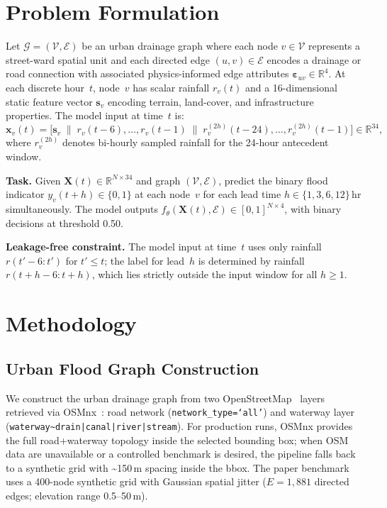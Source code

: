 \documentclass[10pt,twocolumn]{article}
\newcommand{\mat}[1]{\mathbf{#1}}
\newcommand{\calG}{\mathcal{G}}
\newcommand{\calV}{\mathcal{V}}
\newcommand{\calE}{\mathcal{E}}
\newcommand{\RR}{\mathbb{R}}
\begin{document}
\section{Problem Formulation}
\label{sec:problem}

Let $\calG{=}(\calV,\calE)$ be an urban drainage graph where each node
$v\in\calV$ represents a street-ward spatial unit and each directed edge
$(u,v)\in\calE$ encodes a drainage or road connection with associated
physics-informed edge attributes $\bm{\varepsilon}_{uv}\in\RR^4$.
At each discrete hour~$t$, node~$v$ has scalar rainfall $r_v(t)$ and a
16-dimensional static feature vector $\bm{s}_v$ encoding terrain,
land-cover, and infrastructure properties.
The model input at time~$t$ is:
\begin{equation}
  \bm{x}_v(t) = \bigl[\bm{s}_v \;\big\|\;
                       r_v(t{-}6),\ldots,r_v(t{-}1) \;\big\|\;
                       r_v^{(2h)}(t{-}24),\ldots,r_v^{(2h)}(t{-}1)
                \bigr]
  \in \RR^{34},
\end{equation}
where $r_v^{(2h)}$ denotes bi-hourly sampled rainfall for the
24-hour antecedent window.

\noindent\textbf{Task.}
Given $\mat{X}(t)\in\RR^{N\times 34}$ and graph $(\calV,\calE)$, predict
the binary flood indicator $y_v(t{+}h)\in\{0,1\}$ at each node~$v$ for
each lead time $h\in\{1,3,6,12\}$\,hr simultaneously.
The model outputs $f_\theta(\mat{X}(t),\calE)\in[0,1]^{N\times 4}$, with
binary decisions at threshold 0.50.

\noindent\textbf{Leakage-free constraint.}
The model input at time~$t$ uses only rainfall $r(t'{-}6:t')$ for
$t'\leq t$; the label for lead~$h$ is determined by rainfall
$r(t{+}h{-}6:t{+}h)$, which lies strictly outside the input window for
all $h\geq 1$.

\section{Methodology}
\label{sec:method}

\subsection{Urban Flood Graph Construction}

We construct the urban drainage graph from two OpenStreetMap~\cite{osm2023}
layers retrieved via OSMnx~\cite{boeing2017}: road network
(\texttt{network\_type=`all'}) and waterway layer
(\texttt{waterway\textasciitilde{}drain|canal|river|stream}).
For production runs, OSMnx provides the full road+waterway topology inside
the selected bounding box; when OSM data are unavailable or a controlled
benchmark is desired, the pipeline falls back to a synthetic grid with
\mbox{\textasciitilde150\,m} spacing inside the bbox. The paper benchmark
uses a 400-node synthetic grid with Gaussian spatial jitter
($E{=}1{,}881$ directed edges; elevation range 0.5--50\,m).
\end{document}
